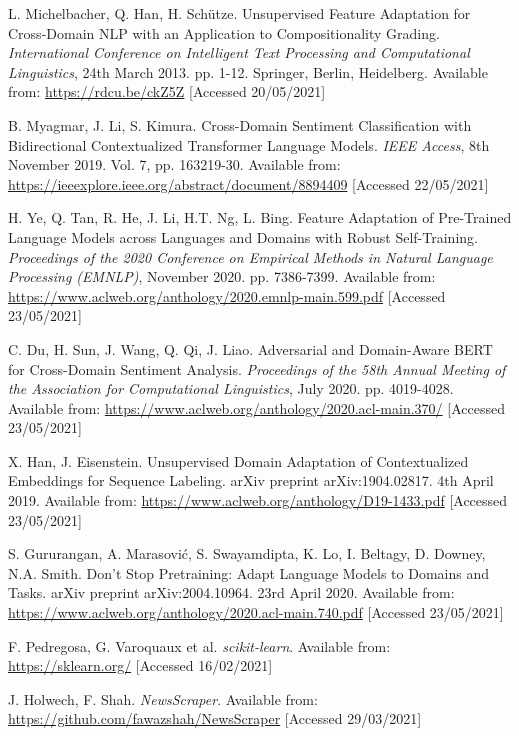 \begin{thebibliography}{9}
L. Michelbacher, Q. Han, H. Schütze. Unsupervised Feature Adaptation for Cross-Domain NLP with an Application to Compositionality Grading. \textit{International Conference on Intelligent Text Processing and Computational Linguistics}, 24th March 2013. pp. 1-12. Springer, Berlin, Heidelberg. Available from: \url{https://rdcu.be/ckZ5Z} [Accessed 20/05/2021]

B. Myagmar, J. Li, S. Kimura. Cross-Domain Sentiment Classification with Bidirectional Contextualized Transformer Language Models. \textit{IEEE Access}, 8th November 2019. Vol. 7, pp. 163219-30. Available from: \url{https://ieeexplore.ieee.org/abstract/document/8894409} [Accessed 22/05/2021]

H. Ye, Q. Tan, R. He, J. Li, H.T. Ng, L. Bing. Feature Adaptation of Pre-Trained Language Models across Languages and Domains with Robust Self-Training. \textit{Proceedings of the 2020 Conference on Empirical Methods in Natural Language Processing (EMNLP)}, November 2020. pp. 7386-7399. Available from: \url{https://www.aclweb.org/anthology/2020.emnlp-main.599.pdf} [Accessed 23/05/2021]

C. Du, H. Sun, J. Wang, Q. Qi, J. Liao. Adversarial and Domain-Aware BERT for Cross-Domain Sentiment Analysis. \textit{Proceedings of the 58th Annual Meeting of the Association for Computational Linguistics}, July 2020. pp. 4019-4028. Available from: \url{https://www.aclweb.org/anthology/2020.acl-main.370/} [Accessed 23/05/2021]

X. Han, J. Eisenstein. Unsupervised Domain Adaptation of Contextualized Embeddings for Sequence Labeling. arXiv preprint arXiv:1904.02817. 4th April 2019. Available from: \url{https://www.aclweb.org/anthology/D19-1433.pdf} [Accessed 23/05/2021]

S. Gururangan, A. Marasović, S. Swayamdipta, K. Lo, I. Beltagy, D. Downey, N.A. Smith. Don't Stop Pretraining: Adapt Language Models to Domains and Tasks. arXiv preprint arXiv:2004.10964. 23rd April 2020. Available from: \url{https://www.aclweb.org/anthology/2020.acl-main.740.pdf} [Accessed 23/05/2021]

F. Pedregosa, G. Varoquaux et al. \textit{scikit-learn}. Available from: \url{https://sklearn.org/} [Accessed 16/02/2021]

J. Holwech, F. Shah. \textit{NewsScraper}. Available from: \url{https://github.com/fawazshah/NewsScraper} [Accessed 29/03/2021]


\end{thebibliography}
